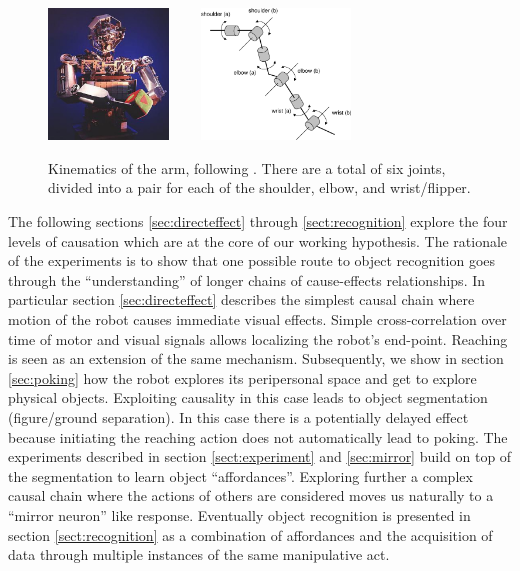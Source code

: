 \ifverbose
\begin{figure}[tbh]
\begin{center}
\includegraphics[height=3.5cm]{cog5-flip.eps}
\ \ \ \ 
\includegraphics[height=3.5cm]{arm-motors.eps}
\caption{ 
\label{fig:arm-motors}
%
Kinematics of the arm, following \protect\cite{williamson99robot}.
There are a total of six joints, divided into a pair for each of
the shoulder, elbow, and wrist/flipper.
%
}
\end{center}
\end{figure}
\fi

\ifrev
The following sections \ref{sec:directeffect} through \ref{sect:recognition} 
explore the four levels of causation which are at the core of 
our working hypothesis. The rationale of the experiments is to show
that one possible route to object recognition goes through the
``understanding'' of longer chains of cause-effects relationships.
In particular section \ref{sec:directeffect} describes the simplest causal
chain where motion of the robot causes immediate visual effects. Simple
cross-correlation over time of motor and visual signals allows localizing
the robot's end-point. Reaching is seen as an extension of the same
mechanism. 
Subsequently, we show in section \ref{sec:poking} how the robot 
explores its peripersonal space and get to explore physical objects.
Exploiting causality in this case leads to object segmentation 
(figure/ground separation). In this case there is a potentially
delayed effect because initiating the reaching action does not
automatically lead to poking.
The experiments described in section \ref{sect:experiment} and 
\ref {sec:mirror} build on top of the segmentation to learn object 
``affordances''. Exploring further a complex causal chain where
the actions of others are considered moves us naturally to 
a ``mirror neuron'' like response.
Eventually object recognition is presented in section \ref{sect:recognition}
as a combination of affordances and the acquisition of data 
through multiple instances of the same manipulative act.
\fi